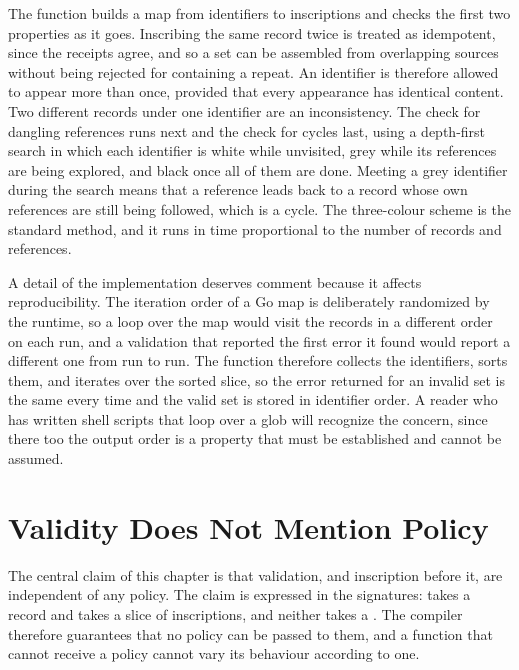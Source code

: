 
The function  builds a map from identifiers to inscriptions and checks the first two properties as it goes. Inscribing the same record twice is treated as idempotent, since the receipts agree, and so a set can be assembled from overlapping sources without being rejected for containing a repeat. An identifier is therefore allowed to appear more than once, provided that every appearance has identical content. Two different records under one identifier are an inconsistency. The check for dangling references runs next and the check for cycles last, using a depth-first search in which each identifier is white while unvisited, grey while its references are being explored, and black once all of them are done. Meeting a grey identifier during the search means that a reference leads back to a record whose own references are still being followed, which is a cycle. The three-colour scheme is the standard method, and it runs in time proportional to the number of records and references.

A detail of the implementation deserves comment because it affects reproducibility. The iteration order of a Go map is deliberately randomized by the runtime, so a loop over the map would visit the records in a different order on each run, and a validation that reported the first error it found would report a different one from run to run. The function therefore collects the identifiers, sorts them, and iterates over the sorted slice, so the error returned for an invalid set is the same every time and the valid set is stored in identifier order. A reader who has written shell scripts that loop over a glob will recognize the concern, since there too the output order is a property that must be established and cannot be assumed.

\section{Validity Does Not Mention Policy}

The central claim of this chapter is that validation, and inscription before it, are independent of any policy. The claim is expressed in the signatures:  takes a record and  takes a slice of inscriptions, and neither takes a . The compiler therefore guarantees that no policy can be passed to them, and a function that cannot receive a policy cannot vary its behaviour according to one.

